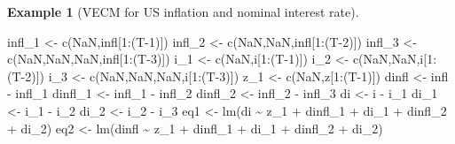 \documentclass[
  12pt,
]{book}
\newenvironment{Shaded}{\begin{snugshade}}{\end{snugshade}}
\newcommand{\ConstantTok}[1]{\textcolor[rgb]{0.00,0.00,0.00}{#1}}
\newcommand{\DecValTok}[1]{\textcolor[rgb]{0.00,0.00,0.81}{#1}}
\newcommand{\FunctionTok}[1]{\textcolor[rgb]{0.00,0.00,0.00}{#1}}
\newcommand{\NormalTok}[1]{#1}
\newcommand{\OtherTok}[1]{\textcolor[rgb]{0.56,0.35,0.01}{#1}}
\newcommand{\SpecialCharTok}[1]{\textcolor[rgb]{0.00,0.00,0.00}{#1}}
\theoremstyle{definition}
\theoremstyle{definition}
\newtheorem{example}{Example}[chapter]
\theoremstyle{definition}
\theoremstyle{definition}
\theoremstyle{remark}
\begin{document}
\begin{example}[VECM for US inflation and nominal interest rate]
\begin{Shaded}
\begin{Highlighting}[]
\NormalTok{infl\_1 }\OtherTok{\textless{}{-}} \FunctionTok{c}\NormalTok{(}\ConstantTok{NaN}\NormalTok{,infl[}\DecValTok{1}\SpecialCharTok{:}\NormalTok{(T}\DecValTok{{-}1}\NormalTok{)])}
\NormalTok{infl\_2 }\OtherTok{\textless{}{-}} \FunctionTok{c}\NormalTok{(}\ConstantTok{NaN}\NormalTok{,}\ConstantTok{NaN}\NormalTok{,infl[}\DecValTok{1}\SpecialCharTok{:}\NormalTok{(T}\DecValTok{{-}2}\NormalTok{)])}
\NormalTok{infl\_3 }\OtherTok{\textless{}{-}} \FunctionTok{c}\NormalTok{(}\ConstantTok{NaN}\NormalTok{,}\ConstantTok{NaN}\NormalTok{,}\ConstantTok{NaN}\NormalTok{,infl[}\DecValTok{1}\SpecialCharTok{:}\NormalTok{(T}\DecValTok{{-}3}\NormalTok{)])}
\NormalTok{i\_1 }\OtherTok{\textless{}{-}} \FunctionTok{c}\NormalTok{(}\ConstantTok{NaN}\NormalTok{,i[}\DecValTok{1}\SpecialCharTok{:}\NormalTok{(T}\DecValTok{{-}1}\NormalTok{)])}
\NormalTok{i\_2 }\OtherTok{\textless{}{-}} \FunctionTok{c}\NormalTok{(}\ConstantTok{NaN}\NormalTok{,}\ConstantTok{NaN}\NormalTok{,i[}\DecValTok{1}\SpecialCharTok{:}\NormalTok{(T}\DecValTok{{-}2}\NormalTok{)])}
\NormalTok{i\_3 }\OtherTok{\textless{}{-}} \FunctionTok{c}\NormalTok{(}\ConstantTok{NaN}\NormalTok{,}\ConstantTok{NaN}\NormalTok{,}\ConstantTok{NaN}\NormalTok{,i[}\DecValTok{1}\SpecialCharTok{:}\NormalTok{(T}\DecValTok{{-}3}\NormalTok{)])}
\NormalTok{z\_1 }\OtherTok{\textless{}{-}} \FunctionTok{c}\NormalTok{(}\ConstantTok{NaN}\NormalTok{,z[}\DecValTok{1}\SpecialCharTok{:}\NormalTok{(T}\DecValTok{{-}1}\NormalTok{)])}
\NormalTok{dinfl   }\OtherTok{\textless{}{-}}\NormalTok{ infl   }\SpecialCharTok{{-}}\NormalTok{ infl\_1}
\NormalTok{dinfl\_1 }\OtherTok{\textless{}{-}}\NormalTok{ infl\_1 }\SpecialCharTok{{-}}\NormalTok{ infl\_2}
\NormalTok{dinfl\_2 }\OtherTok{\textless{}{-}}\NormalTok{ infl\_2 }\SpecialCharTok{{-}}\NormalTok{ infl\_3}
\NormalTok{di   }\OtherTok{\textless{}{-}}\NormalTok{ i   }\SpecialCharTok{{-}}\NormalTok{ i\_1}
\NormalTok{di\_1 }\OtherTok{\textless{}{-}}\NormalTok{ i\_1 }\SpecialCharTok{{-}}\NormalTok{ i\_2}
\NormalTok{di\_2 }\OtherTok{\textless{}{-}}\NormalTok{ i\_2 }\SpecialCharTok{{-}}\NormalTok{ i\_3}
\NormalTok{eq1 }\OtherTok{\textless{}{-}} \FunctionTok{lm}\NormalTok{(di    }\SpecialCharTok{\textasciitilde{}}\NormalTok{ z\_1 }\SpecialCharTok{+}\NormalTok{ dinfl\_1 }\SpecialCharTok{+}\NormalTok{ di\_1 }\SpecialCharTok{+}\NormalTok{ dinfl\_2 }\SpecialCharTok{+}\NormalTok{ di\_2)}
\NormalTok{eq2 }\OtherTok{\textless{}{-}} \FunctionTok{lm}\NormalTok{(dinfl }\SpecialCharTok{\textasciitilde{}}\NormalTok{ z\_1 }\SpecialCharTok{+}\NormalTok{ dinfl\_1 }\SpecialCharTok{+}\NormalTok{ di\_1 }\SpecialCharTok{+}\NormalTok{ dinfl\_2 }\SpecialCharTok{+}\NormalTok{ di\_2)}
\end{Highlighting}
\end{Shaded}


\end{example}
\end{document}
